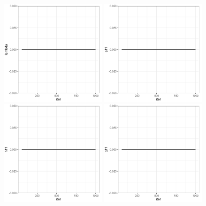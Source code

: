 \begin{figure}[H]
    \centering
    \includegraphics[width=0.45\textwidth]{../figures/trace_lambda.png}
    \includegraphics[width=0.45\textwidth]{../figures/trace_A11.png}
    \includegraphics[width=0.45\textwidth]{../figures/trace_H11.png}
    \includegraphics[width=0.45\textwidth]{../figures/trace_Q11.png}

\end{figure}
